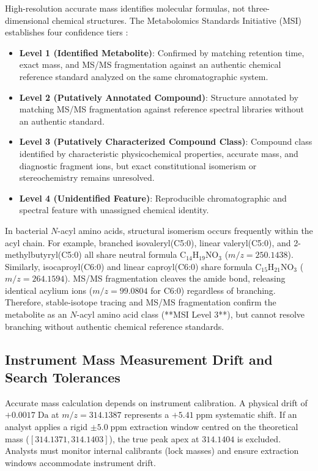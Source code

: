 \documentclass[11pt,twoside,openright]{book}
\begin{document}
High-resolution accurate mass identifies molecular formulas, not three-dimensional chemical structures. The Metabolomics Standards Initiative (MSI) establishes four confidence tiers \cite{sumner2007proposed}:
\begin{itemize}
    \item \textbf{Level 1 (Identified Metabolite)}: Confirmed by matching retention time, exact mass, and MS/MS fragmentation against an authentic chemical reference standard analyzed on the same chromatographic system.
    \item \textbf{Level 2 (Putatively Annotated Compound)}: Structure annotated by matching MS/MS fragmentation against reference spectral libraries without an authentic standard.
    \item \textbf{Level 3 (Putatively Characterized Compound Class)}: Compound class identified by characteristic physicochemical properties, accurate mass, and diagnostic fragment ions, but exact constitutional isomerism or stereochemistry remains unresolved.
    \item \textbf{Level 4 (Unidentified Feature)}: Reproducible chromatographic and spectral feature with unassigned chemical identity.
\end{itemize}

In bacterial $N$-acyl amino acids, structural isomerism occurs frequently within the acyl chain. For example, branched isovaleryl(C5:0), linear valeryl(C5:0), and 2-methylbutyryl(C5:0) all share neutral formula $\text{C}_{14}\text{H}_{19}\text{NO}_3$ ($m/z = 250.1438$). Similarly, isocaproyl(C6:0) and linear caproyl(C6:0) share formula $\text{C}_{15}\text{H}_{21}\text{NO}_3$ ($m/z = 264.1594$). MS/MS fragmentation cleaves the amide bond, releasing identical acylium ions ($m/z = 99.0804$ for C6:0) regardless of branching. Therefore, stable-isotope tracing and MS/MS fragmentation confirm the metabolite as an $N$-acyl amino acid class (**MSI Level 3**), but cannot resolve branching without authentic chemical reference standards.

\subsection{Instrument Mass Measurement Drift and Search Tolerances}

Accurate mass calculation depends on instrument calibration. A physical drift of $+0.0017\;\text{Da}$ at $m/z = 314.1387$ represents a $+5.41\;\text{ppm}$ systematic shift. If an analyst applies a rigid $\pm 5.0\;\text{ppm}$ extraction window centred on the theoretical mass ($[314.1371, 314.1403]$), the true peak apex at $314.1404$ is excluded. Analysts must monitor internal calibrants (lock masses) and ensure extraction windows accommodate instrument drift.
\end{document}
